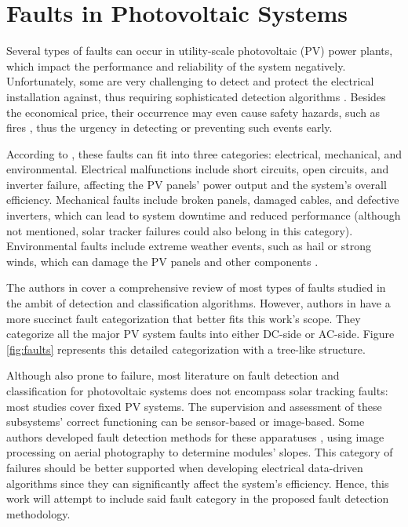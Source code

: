 
\section{Faults in Photovoltaic Systems}

Several types of faults can occur in utility-scale photovoltaic (PV) power plants, which impact the performance and reliability of the system negatively. Unfortunately, some are very challenging to detect and protect the electrical installation against, thus requiring sophisticated detection algorithms \cite{Pillai2018}. Besides the economical price, their occurrence may even cause safety hazards, such as fires \cite{Alam2015}, thus the urgency in detecting or preventing such events early.

According to \cite{Pillai2018}, these faults can fit into three categories: electrical, mechanical, and environmental. Electrical malfunctions include short circuits, open circuits, and inverter failure, affecting the PV panels' power output and the system's overall efficiency. Mechanical faults include broken panels, damaged cables, and defective inverters, which can lead to system downtime and reduced performance (although not mentioned, solar tracker failures could also belong in this category). Environmental faults include extreme weather events, such as hail or strong winds, which can damage the PV panels and other components \cite{faults}.

The authors in \cite{Hong2022} cover a comprehensive review of most types of faults studied in the ambit of detection and classification algorithms. However, authors in \cite{Livera2019} have a more succinct fault categorization that better fits this work's scope. They categorize all the major PV system faults into either DC-side or AC-side. Figure \ref{fig:faults} represents this detailed categorization with a tree-like structure.

Although also prone to failure, most literature on fault detection and classification for photovoltaic systems does not encompass solar tracking faults: most studies cover fixed PV systems. The supervision and assessment of these subsystems' correct functioning can be sensor-based \cite{Stepanov2014} or image-based. Some authors developed fault detection methods for these apparatuses \cite{Amaral2021}, using image processing on aerial photography to determine modules' slopes. This category of failures should be better supported when developing electrical data-driven algorithms since they can significantly affect the system's efficiency. Hence, this work will attempt to include said fault category in the proposed fault detection methodology.

